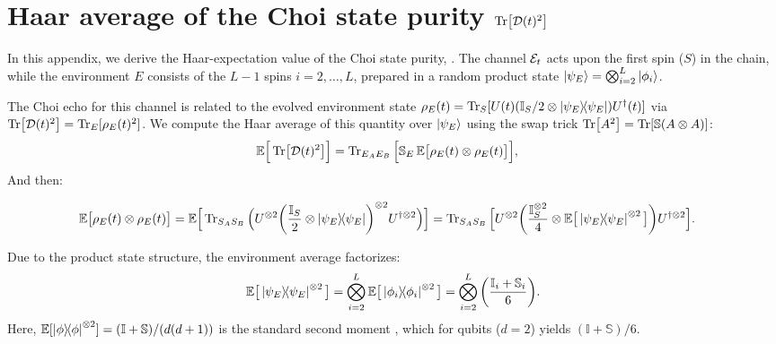 \appendix
\section{Haar average of the Choi state purity $\Tr[\mathcal{D}(t)^2]$}
\label{app:haar}
In this appendix, we derive the Haar-expectation value of the
Choi state purity, . The channel $\mathcal{E}_t$
acts upon the first spin ($S$) in the chain,
while the environment $E$ consists of the $L-1$ spins
$i=2, \dots, L$, prepared in a random product state
$\ket{\psi_E} = \bigotimes_{i=2}^L \ket{\phi_i}$.

The Choi echo for this channel is related to the evolved
environment state $\rho_E(t) = \Tr_S[U(t) (\mathbb{I}_S/2 \otimes
\dyad{\psi_E}) U^\dagger(t)]$ via
$\Tr[\mathcal{D}(t)^2] = \Tr_E[\rho_E(t)^2]$.
We compute the Haar average of this quantity over $\ket{\psi_E}$
using the swap trick $\Tr[A^2] = \Tr[\mathbb{S} (A \otimes A)]$:
\begin{align}
\mathbb{E}\Big[\Tr[\mathcal{D}(t)^2]\Big]
&= \Tr_{E_A E_B} \Big[
\mathbb{S}_E \, \mathbb{E}\big[ \rho_E(t) \otimes \rho_E(t) \big] \Big],
\label{eq:app:avg_swap}
\end{align}
And then:
\begin{widetext}
\begin{align}
\mathbb{E}\big[ \rho_E(t) \otimes \rho_E(t) \big]
&= \mathbb{E}\Big[
\Tr_{S_A S_B} \Big(
U^{\otimes 2}
\qty( \frac{\mathbb{I}_S}{2} \otimes \dyad{\psi_E} )^{\otimes 2}
U^{\dagger \otimes 2}
\Big) \Big]
%
= \Tr_{S_A S_B} \Big[
U^{\otimes 2}
\qty( \frac{\mathbb{I}_S^{\otimes 2}}{4} \otimes
\mathbb{E}\big[\dyad{\psi_E}^{\otimes 2}\big] )
U^{\dagger \otimes 2}
\Big].
\label{eq:app:avg_rhoE_tensor}
\end{align}
\end{widetext}
Due to the product state structure, the environment average
factorizes:
\begin{equation}
\mathbb{E}\big[\dyad{\psi_E}^{\otimes 2}\big]
= \bigotimes_{i=2}^L
\mathbb{E}\big[\dyad{\phi_i}^{\otimes 2}\big]
= \bigotimes_{i=2}^L \qty( \frac{\mathbb{I}_i + \mathbb{S}_i}{6} ).
\label{eq:app:haar_moment_2_qubit}
\end{equation}
Here, $\mathbb{E}[\dyad{\phi}^{\otimes 2}] = (\mathbb{I} + \mathbb{S})/(d(d+1))$
is the standard second moment \cite{collins_2022_weingarten},
which for qubits ($d=2$) yields
$(\mathbb{I} + \mathbb{S})/6$.


